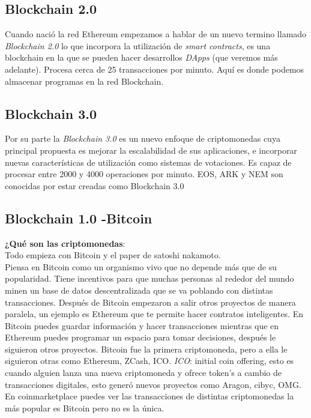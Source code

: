 \documentclass[a4paper,12pt]{/home/armando/Documentos/Cursos/LaTeX/Plantillas/lib/pub}
\begin{document}
\subsection{Blockchain 2.0}
Cuando nació la red Ethereum empezamos a hablar de un nuevo termino llamado \textit{Blockchain 2.0} lo que incorpora la utilización de \textit{smart contracts}, es una blockchain en la que se pueden hacer desarrollos \textit{DApps} (que veremos más adelante). Procesa cerca de 25 transacciones por minuto. Aquí es donde podemos almacenar programas en la red Blockchain.

\subsection{Blockchain 3.0}
Por su parte la \textit{Blockchain 3.0} es un nuevo enfoque de criptomonedas cuya principal propuesta es mejorar la escalabilidad de sus aplicaciones, e incorporar nuevas características de utilización como sistemas de votaciones. Es capaz de procesar entre 2000 y 4000 operaciones por minuto. EOS, ARK y NEM son conocidas por estar creadas como Blockchain 3.0

\subsection{Blockchain 1.0 -Bitcoin}
\textbf{¿Qué son las criptomonedas}:\\
Todo empieza con Bitcoin y el paper de satoshi nakamoto.\\
Piensa en Bitcoin como un organismo vivo que no depende más que de su popularidad. Tiene incentivos para que muchas personas al rededor del mundo minen un base de datos descentralizada que se va poblando con distintas transacciones.
Después de Bitcoin empezaron a salir otros proyectos de manera paralela, un ejemplo es Ethereum que te permite hacer contratos inteligentes.
En Bitcoin puedes guardar información y hacer transacciones mientras que en Ethereum puedes programar un espacio para tomar decisiones, después le siguieron otros proyectos.
Bitcoin fue la primera criptomoneda, pero a ella le siguieron otras como Ethereum, ZCash, ICO.
\textit{ICO}: initial coin offering, esto es cuando alguien lanza una nueva criptomoneda y ofrece token's a cambio de transacciones digitales, esto generó nuevos proyectos como Aragon, cibyc, OMG.
En coinmarketplace puedes ver las transacciones de distintas criptomonedas la más popular es Bitcoin pero no es la única.\\
\end{document}
